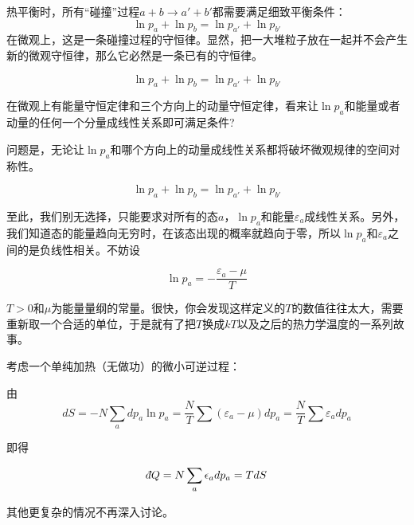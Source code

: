 \documentclass[CJK]{beamer}
\begin{document}
\begin{frame}
\bch
{
热平衡时，所有“碰撞”过程$a+b \rightarrow a'+b'$都需要满足细致平衡条件：
$$\ln p_a + \ln p_b = \ln p_{a'} + \ln p_{b'}$$
在微观上，这是一条碰撞过程的守恒律。显然，把一大堆粒子放在一起并不会产生新的微观守恒律，那么它必然是一条已有的守恒律。

}
\ech
\end{frame}

\begin{frame}
\bch

$$\ln p_a + \ln p_b = \ln p_{a'} + \ln p_{b'}$$

\skipline

在微观上有能量守恒定律和三个方向上的动量守恒定律，看来让$\ln p_a$和能量或者动量的任何一个分量成线性关系即可满足条件?

\skipline

问题是，无论让$\ln p_a$和哪个方向上的动量成线性关系都将破坏{\blue 微观规律的空间对称性}。


\ech
\end{frame}

\begin{frame}
\bch

$$\ln p_a + \ln p_b = \ln p_{a'} + \ln p_{b'}$$

\skipline

至此，我们别无选择，只能要求对所有的态$a$，$\ln p_a$和能量$\varepsilon_a$成线性关系。另外，我们知道态的能量趋向无穷时，在该态出现的概率就趋向于零，所以$\ln p_a$和$\varepsilon_a$之间的是负线性相关。不妨设

$$\ln p_a = -\frac{\varepsilon_a - \mu}{T}$$

$T>0$和$\mu$为能量量纲的常量。很快，你会发现这样定义的$T$的数值往往太大，需要重新取一个合适的单位，于是就有了把$T$换成$kT$以及之后的热力学温度的一系列故事。
\ech
\end{frame}


\begin{frame}
\bch
考虑一个单纯加热（无做功）的微小可逆过程：

由
$$dS = -N \sum_a dp_a \ln p_a = \frac{N}{T}\sum (\varepsilon_a-\mu) dp_a = \frac{N}{T}\sum \varepsilon_a  dp_a $$

即得

$$\dbar Q = N\sum_a \epsilon_a d p_a = T dS $$

其他更复杂的情况不再深入讨论。

\ech
\end{frame}
\end{document}
